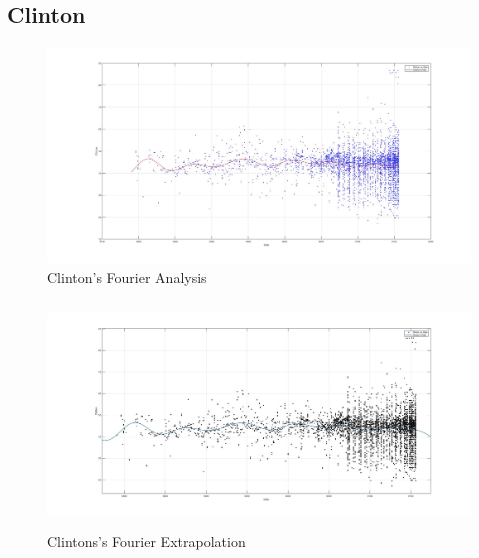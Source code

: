 \documentclass[twoside]{article}
\begin{document}
\newpage
\subsection{Clinton}
\begin{figure}[H]
  \centering
    \includegraphics[width=\textwidth]{images/fourier/clinton.jpg}
    \caption{Clinton's Fourier Analysis}
\end{figure}
 \begin{figure}[H]
   \centering
     \includegraphics[width=\textwidth,height=6cm]{images/fourier/clintonlarge.jpg}
     \caption{Clintons's Fourier Extrapolation}
 \end{figure}
\end{document}
